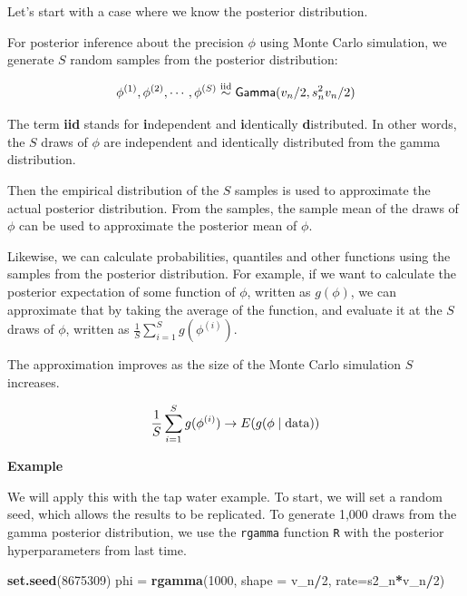 \documentclass[]{book}
\newenvironment{Shaded}{\begin{snugshade}}{\end{snugshade}}
\newcommand{\KeywordTok}[1]{\textcolor[rgb]{0.13,0.29,0.53}{\textbf{#1}}}
\newcommand{\DataTypeTok}[1]{\textcolor[rgb]{0.13,0.29,0.53}{#1}}
\newcommand{\DecValTok}[1]{\textcolor[rgb]{0.00,0.00,0.81}{#1}}
\newcommand{\StringTok}[1]{\textcolor[rgb]{0.31,0.60,0.02}{#1}}
\newcommand{\OperatorTok}[1]{\textcolor[rgb]{0.81,0.36,0.00}{\textbf{#1}}}
\newcommand{\NormalTok}[1]{#1}
\theoremstyle{definition}
\theoremstyle{definition}
\theoremstyle{definition}
\theoremstyle{remark}
\begin{document}
Let's start with a case where we know the posterior distribution.

For posterior inference about the precision \(\phi\) using Monte Carlo
simulation, we generate \(S\) random samples from the posterior
distribution:

\[\phi^{(1)},\phi^{(2)},\cdots,\phi^{(S)} \mathrel{\mathop{\sim}\limits^{\rm iid}} \textsf{Gamma}(v_n/2,s^2_n v_n/2)\]

The term \textbf{iid} stands for \textbf{i}ndependent and
\textbf{i}dentically \textbf{d}istributed. In other words, the \(S\)
draws of \(\phi\) are independent and identically distributed from the
gamma distribution.

Then the empirical distribution of the \(S\) samples is used to
approximate the actual posterior distribution. From the samples, the
sample mean of the draws of \(\phi\) can be used to approximate the
posterior mean of \(\phi\).

Likewise, we can calculate probabilities, quantiles and other functions
using the samples from the posterior distribution. For example, if we
want to calculate the posterior expectation of some function of
\(\phi\), written as \(g(\phi)\), we can approximate that by taking the
average of the function, and evaluate it at the \(S\) draws of \(\phi\),
written as \(\frac{1}{S}\sum^S_{i=1}g(\phi^{(i)})\).

The approximation improves as the size of the Monte Carlo simulation
\(S\) increases.

\[\frac{1}{S}\sum^S_{i=1}g(\phi^{(i)}) \rightarrow E(g(\phi \mid \text{data}))\]

\textbf{Example}

We will apply this with the tap water example. To start, we will set a
random seed, which allows the results to be replicated. To generate
1,000 draws from the gamma posterior distribution, we use the
\texttt{rgamma} function \texttt{R} with the posterior hyperparameters
from last time.

\begin{Shaded}
\begin{Highlighting}[]
\KeywordTok{set.seed}\NormalTok{(}\DecValTok{8675309}\NormalTok{)}
\NormalTok{phi =}\StringTok{ }\KeywordTok{rgamma}\NormalTok{(}\DecValTok{1000}\NormalTok{, }\DataTypeTok{shape =}\NormalTok{ v_n}\OperatorTok{/}\DecValTok{2}\NormalTok{, }\DataTypeTok{rate=}\NormalTok{s2_n}\OperatorTok{*}\NormalTok{v_n}\OperatorTok{/}\DecValTok{2}\NormalTok{)}
\end{Highlighting}
\end{Shaded}
\end{document}
